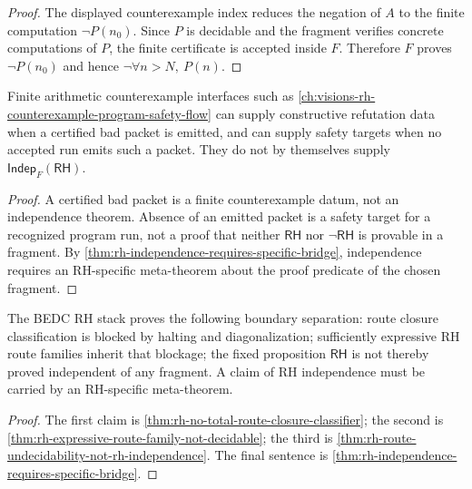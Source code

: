 \begin{proof}
The displayed counterexample index reduces the negation of $A$ to the
finite computation $\neg P(n_0)$. Since $P$ is decidable and the fragment
verifies concrete computations of $P$, the finite certificate is accepted
inside $F$. Therefore $F$ proves $\neg P(n_0)$ and hence
$\neg\forall n>N,\ P(n)$.
\end{proof}

\begin{corollary}
\label{cor:rh-arithmetic-counterexample-searches-not-independence}
Finite arithmetic counterexample interfaces such as
\autoref{ch:visions-rh-counterexample-program-safety-flow} can supply
constructive refutation data when a certified bad packet is emitted, and
can supply safety targets when no accepted run emits such a packet. They do
not by themselves supply $\mathsf{Indep}_{F}(\mathsf{RH})$.
\end{corollary}

\begin{proof}
A certified bad packet is a finite counterexample datum, not an
independence theorem. Absence of an emitted packet is a safety target for a
recognized program run, not a proof that neither $\mathsf{RH}$ nor
$\neg\mathsf{RH}$ is provable in a fragment. By
\autoref{thm:rh-independence-requires-specific-bridge}, independence
requires an RH-specific meta-theorem about the proof predicate of the
chosen fragment.
\end{proof}

\begin{corollary}
\label{cor:rh-route-fixed-separation-summary}
The BEDC RH stack proves the following boundary separation: route closure
classification is blocked by halting and diagonalization; sufficiently
expressive RH route families inherit that blockage; the fixed proposition
$\mathsf{RH}$ is not thereby proved independent of any fragment. A claim
of RH independence must be carried by an RH-specific meta-theorem.
\end{corollary}

\begin{proof}
The first claim is
\autoref{thm:rh-no-total-route-closure-classifier}; the second is
\autoref{thm:rh-expressive-route-family-not-decidable}; the third is
\autoref{thm:rh-route-undecidability-not-rh-independence}. The final
sentence is \autoref{thm:rh-independence-requires-specific-bridge}.
\end{proof}

